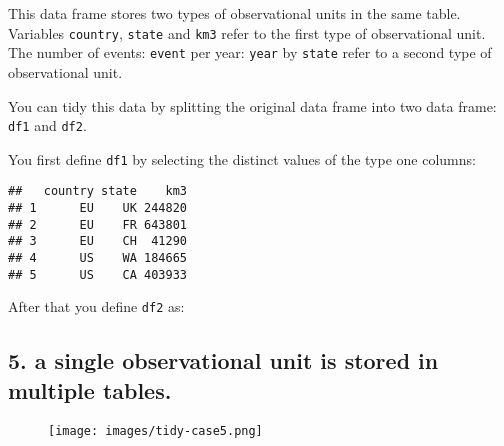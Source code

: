 \documentclass[]{book}
\newenvironment{Shaded}{\begin{snugshade}}{\end{snugshade}}
\newcommand{\KeywordTok}[1]{\textcolor[rgb]{0.13,0.29,0.53}{\textbf{{#1}}}}
\newcommand{\StringTok}[1]{\textcolor[rgb]{0.31,0.60,0.02}{{#1}}}
\newcommand{\NormalTok}[1]{{#1}}
\begin{document}
This data frame stores two types of observational units in the same
table. Variables \texttt{country}, \texttt{state} and \texttt{km3} refer
to the first type of observational unit. The number of events:
\texttt{event} per year: \texttt{year} by \texttt{state} refer to a
second type of observational unit.

You can tidy this data by splitting the original data frame into two
data frame: \texttt{df1} and \texttt{df2}.

You first define \texttt{df1} by selecting the distinct values of the
type one columns:

\begin{Shaded}
\end{Shaded}

\begin{verbatim}
##   country state    km3
## 1      EU    UK 244820
## 2      EU    FR 643801
## 3      EU    CH  41290
## 4      US    WA 184665
## 5      US    CA 403933
\end{verbatim}

After that you define \texttt{df2} as:

\begin{Shaded}
\end{Shaded}

\clearpage

\subsection{5. a single observational unit is stored in multiple
tables.}\label{a-single-observational-unit-is-stored-in-multiple-tables.}

\begin{figure}[htbp]
\centering
\texttt{[image: images/tidy-case5.png]}
\caption{}
\end{figure}
\end{document}
